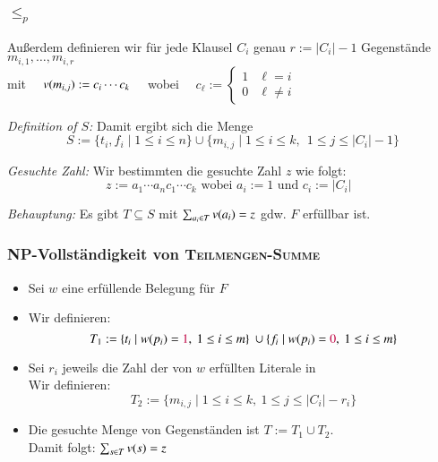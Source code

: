 \documentclass[onlymath]{beamer}
\begin{document}
\begin{frame}
  \frametitle{ $\leq_p$ }

  Außerdem definieren wir für jede Klausel $C_i$ genau $r := |C_i|-1$ Gegenstände
  $m_{i,1}, \ldots, m_{i,r}$\\[5pt]
  mit $\quad v(m_{i, j}) := c_i \cdots c_k\quad$ wobei
  $\quad
  c_\ell :=
  \begin{cases}
    1 & \ell=i\\
    0 & \ell\not= i
  \end{cases}
  $\bigskip\pause

  \emph{Definition of $S$: } Damit ergibt sich die Menge
  \[
     S := \{ t_i, f_i \mid 1\leq i \leq
       n\} \cup \{ m_{i,j} \mid 1\leq i\leq k,~~ 1\leq j \leq |C_i|-1\}
  \]

  \pause\emph{Gesuchte Zahl: } Wir bestimmten die gesuchte Zahl $z$ wie folgt:\\
  \[
     \text{$z := a_1 \cdots a_n c_1 \cdots c_k$ wobei $a_i := 1$ und $c_i := |C_i|$ }
  \]

  \bigskip

  \pause\emph{Behauptung: } Es gibt $T\subseteq S$ mit $\sum_{a_i\in T}
    v(a_i) = z$ gdw. $F$ erfüllbar ist.
\end{frame}


\begin{frame}\frametitle{NP-Vollständigkeit von \textsc{Teilmengen-Summe}}

\bigskip

%
\pause
\begin{itemize}
\item Sei $w$ eine erfüllende Belegung für $F$\pause\\[2ex]
%
\item Wir definieren: 
    \[T_1 :=
		\{ t_i \mid w(p_i) = \textcolor{purple}{1},~ 1\leq i \leq m\}\
			\cup \{ f_i \mid w(p_i) = \textcolor{purple}{0},~ 1\leq i \leq m\}
    \]\pause%
\item Sei $r_i$ jeweils die Zahl der von $w$ erfüllten Literale in \\
Wir definieren:
\[T_2 := \{ m_{i,j}\mid 1\leq i \leq k,~ 1\leq j \leq |C_i|-r_i \}\]\pause%
% 
\item Die gesuchte Menge von Gegenständen ist $T := T_1 \cup T_2$.\\[5pt]
Damit folgt: $\sum_{s\in T} v(s) = z$
\end{itemize}
\end{frame}
\end{document}
